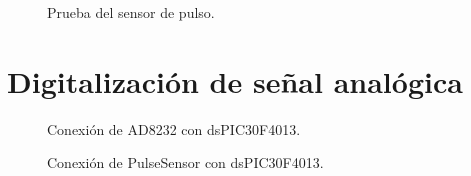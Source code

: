 	\begin{figure}[htbp!]
		\centering
		\caption{Prueba del sensor de pulso.}
		\label{fig:PulseSensor3}
	\end{figure}
	
\section{Digitalización de señal analógica}


	\begin{figure}[htbp!]
		\centering
		\caption{Conexión de AD8232 con dsPIC30F4013.}
		\label{fig:ConexionAD8232}
	\end{figure}
	
	\begin{figure}[htbp!]
		\centering
		\caption{Conexión de PulseSensor con dsPIC30F4013.}
		\label{fig:ConexionPulseSensor}
	\end{figure}
	\pagebreak
	

